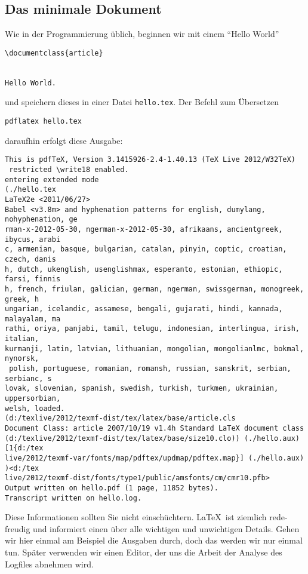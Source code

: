 \subsection{Das minimale Dokument}

Wie in der Programmierung üblich, beginnen wir mit einem "`Hello World"'
\begin{verbatim}
\documentclass{article}


Hello World.

\end{verbatim}
und speichern dieses in einer Datei \texttt{hello.tex}. Der Befehl zum Übersetzen
\begin{verbatim}
pdflatex hello.tex
\end{verbatim}
daraufhin erfolgt diese Ausgabe:
\footnotesize
\begin{verbatim}
This is pdfTeX, Version 3.1415926-2.4-1.40.13 (TeX Live 2012/W32TeX)
 restricted \write18 enabled.
entering extended mode
(./hello.tex
LaTeX2e <2011/06/27>
Babel <v3.8m> and hyphenation patterns for english, dumylang, nohyphenation, ge
rman-x-2012-05-30, ngerman-x-2012-05-30, afrikaans, ancientgreek, ibycus, arabi
c, armenian, basque, bulgarian, catalan, pinyin, coptic, croatian, czech, danis
h, dutch, ukenglish, usenglishmax, esperanto, estonian, ethiopic, farsi, finnis
h, french, friulan, galician, german, ngerman, swissgerman, monogreek, greek, h
ungarian, icelandic, assamese, bengali, gujarati, hindi, kannada, malayalam, ma
rathi, oriya, panjabi, tamil, telugu, indonesian, interlingua, irish, italian,
kurmanji, latin, latvian, lithuanian, mongolian, mongolianlmc, bokmal, nynorsk,
 polish, portuguese, romanian, romansh, russian, sanskrit, serbian, serbianc, s
lovak, slovenian, spanish, swedish, turkish, turkmen, ukrainian, uppersorbian,
welsh, loaded.
(d:/texlive/2012/texmf-dist/tex/latex/base/article.cls
Document Class: article 2007/10/19 v1.4h Standard LaTeX document class
(d:/texlive/2012/texmf-dist/tex/latex/base/size10.clo)) (./hello.aux) [1{d:/tex
live/2012/texmf-var/fonts/map/pdftex/updmap/pdftex.map}] (./hello.aux) )<d:/tex
live/2012/texmf-dist/fonts/type1/public/amsfonts/cm/cmr10.pfb>
Output written on hello.pdf (1 page, 11852 bytes).
Transcript written on hello.log.
\end{verbatim}
\normalsize
Diese Informationen sollten Sie nicht einschüchtern. \LaTeX\ ist ziemlich rede-freudig und informiert einen über alle wichtigen und unwichtigen Details. Gehen wir hier einmal am Beispiel die Ausgaben durch, doch das werden wir nur einmal tun. Später verwenden wir einen Editor, der uns die Arbeit der Analyse des Logfiles abnehmen wird. 

